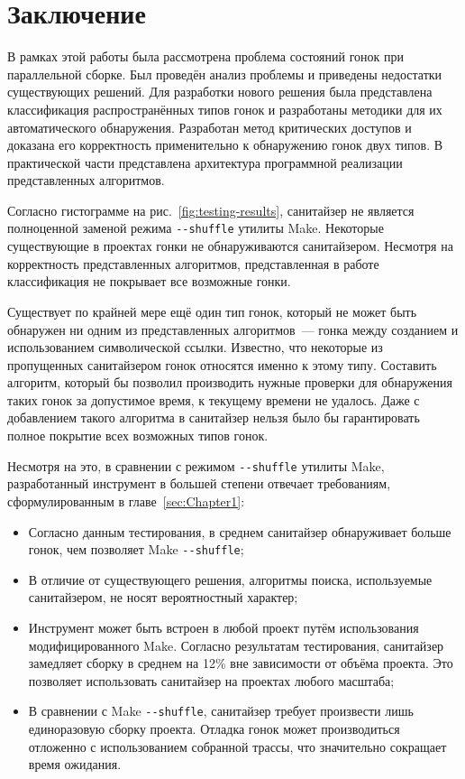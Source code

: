 \section{Заключение}
\label{sec:Chapter5} 


В рамках этой работы была рассмотрена проблема состояний гонок при параллельной сборке. Был проведён анализ проблемы и приведены недостатки существующих решений. Для разработки нового решения была представлена классификация распространённых типов гонок и разработаны методики для их автоматического обнаружения. Разработан метод критических доступов и доказана его корректность применительно к обнаружению гонок двух типов. В практической части представлена архитектура программной реализации представленных алгоритмов.

Согласно гистограмме на рис.~\ref{fig:testing-results}, санитайзер не является полноценной заменой режима \texttt{-{}-shuffle} утилиты Make. Некоторые существующие в проектах гонки не обнаруживаются санитайзером. Несмотря на корректность представленных алгоритмов, представленная в работе классификация не покрывает все возможные гонки.

Существует по крайней мере ещё один тип гонок, который не может быть обнаружен ни одним из представленных алгоритмов~--- гонка между созданием и использованием символической ссылки. Известно, что некоторые из пропущенных санитайзером гонок относятся именно к этому типу. Составить алгоритм, который бы позволил производить нужные проверки для обнаружения таких гонок за допустимое время, к текущему времени не удалось. Даже с добавлением такого алгоритма в санитайзер нельзя было бы гарантировать полное покрытие всех возможных типов гонок.

Несмотря на это, в сравнении с режимом \texttt{-{}-shuffle} утилиты Make, разработанный инструмент в большей степени отвечает требованиям, сформулированным в главе~\ref{sec:Chapter1}:

\begin{itemize}
    \item Согласно данным тестирования, в среднем санитайзер обнаруживает больше гонок, чем позволяет Make \texttt{-{}-shuffle};
    \item В отличие от существующего решения, алгоритмы поиска, используемые санитайзером, не носят вероятностный характер;
    \item Инструмент может быть встроен в любой проект путём использования модифицированного Make. Согласно результатам тестирования, санитайзер замедляет сборку в среднем на 12\% вне зависимости от объёма проекта. Это позволяет использовать санитайзер на проектах любого масштаба;
    \item В сравнении с Make \texttt{-{}-shuffle}, санитайзер требует произвести лишь единоразовую сборку проекта. Отладка гонок может производиться отложенно с использованием собранной трассы, что значительно сокращает время ожидания.
\end{itemize}

